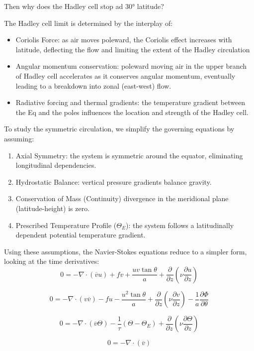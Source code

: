  Then why does the Hadley cell stop ad 30° latitude?

 The Hadley cell limit is determined by the interplay of:
 \begin{itemize}
     \item Coriolis Force: as air moves poleward, the Coriolis effect increases with latitude, deflecting the flow and limiting the extent of the Hadley circulation
     \item Angular momentum conservation: poleward moving air in the upper branch of Hadley cell accelerates as it conserves angular momentum, eventually leading to a breakdown into zonal (east-west) flow. 
     \item Radiative forcing and thermal gradients: the temperature gradient between the Eq and the poles influences the location and strength of the Hadley cell. 
 \end{itemize}

To study the symmetric circulation, we simplify the governing equations by assuming: 
\begin{enumerate}
    \item Axial Symmetry: the system is symmetric around the equator, eliminating longitudinal dependencies.
    \item Hydrostatic Balance: vertical pressure gradients balance gravity.
    \item Conservation of Mass (Continuity) divergence in the meridional plane (latitude-height) is zero.
    \item Prescribed Temperature Profile ($\Theta_E$): the system follows a latitudinally dependent potential temperature gradient. 
\end{enumerate}
Using these assumptions, the Navier-Stokes equations reduce to a simpler form, looking at the time derivatives:
\[
0 = -\nabla \cdot ({\overline{v}}{u}) + f v 
+ \frac{u v \tan \theta}{a} 
+ \frac{\partial}{\partial z} \left( \nu \frac{\partial u}{\partial z} \right)
\]

\[
0 = -\nabla \cdot (v \overline{v}) - f u 
- \frac{u^2 \tan \theta}{a} 
+ \frac{\partial}{\partial z} \left( \nu \frac{\partial v}{\partial z} \right) 
- \frac{1}{a} \frac{\partial \Phi}{\partial \theta}
\]

\[
0 = -\nabla \cdot ({\overline{v}} {\Theta}) 
- \frac{1}{\tau} (\Theta - \Theta_E) 
+ \frac{\partial}{\partial z} \left( \nu \frac{\partial \Theta}{\partial z} \right)
\]

\[
0 = -\nabla \cdot ({\overline{v}})
\]

